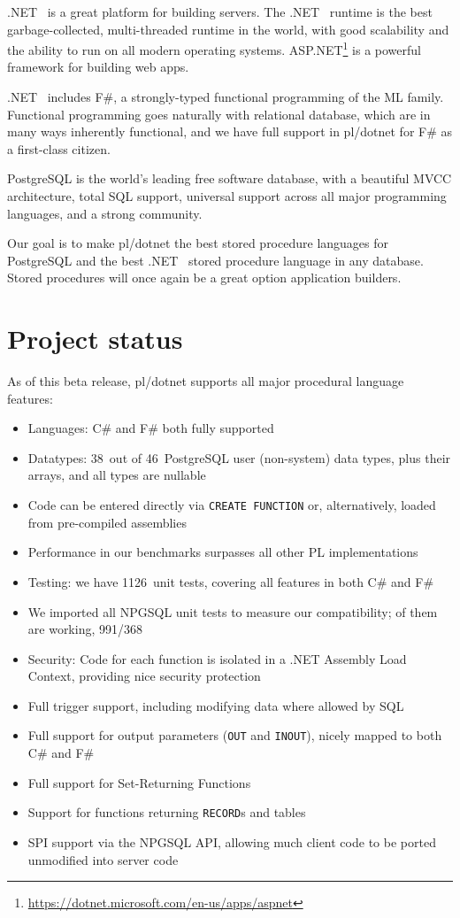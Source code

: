 \documentclass[sigconf,techreport,authorversion,nonacm]{acmart}
\newcommand{\dotnet}{.NET }
\newcommand{\psqltypecount}{46}
\newcommand{\pldotnettypecount}{38}
\newcommand{\unittestcount}{1126}
\newcommand{\npgsqlcount}{991}
\newcommand{\npgsqlpassing}{368}
\begin{document}
\dotnet\ is a great platform for building servers. The \dotnet\ runtime
is the best garbage-collected, multi-threaded runtime in the world, with
good scalability and the ability to run on all modern operating systems.
ASP.NET\footnote{\url{https://dotnet.microsoft.com/en-us/apps/aspnet}}
is a powerful framework for building web apps.

\dotnet\ includes F\#, a strongly-typed functional programming of the ML
family.  Functional programming goes naturally with relational database,
which are in many ways inherently functional, and we have full support
in pl/dotnet for F\# as a first-class citizen.

PostgreSQL is the world's leading free software database, with a
beautiful MVCC architecture, total SQL support, universal support
across all major programming languages, and a strong community.

Our goal is to make pl/dotnet the best stored procedure
languages for PostgreSQL and the best \dotnet\ stored procedure
language in any database.  Stored procedures will once again
be a great option application builders.

\section{Project status}

As of this beta release, pl/dotnet supports all major procedural language features:

\begin{itemize}[itemsep=0pt]
    \item Languages: C\# and F\# both fully supported
    \item Datatypes: \pldotnettypecount\ out of \psqltypecount\ PostgreSQL user (non-system) data types, plus their arrays, and all types are nullable
    \item Code can be entered directly via \texttt{CREATE FUNCTION} or, alternatively, loaded from pre-compiled assemblies
    \item Performance in our benchmarks surpasses all other PL implementations
    \item Testing: we have \unittestcount\, unit tests, covering all features in both C\# and F\#
    \item We imported all NPGSQL unit tests to measure our compatibility; \npgsqlpercentage of them are working, \npgsqlcount /\npgsqlpassing
    \item Security: Code for each function is isolated in a \dotnet Assembly Load Context, providing nice security protection
    \item Full trigger support, including modifying data where allowed by SQL
    \item Full support for output parameters (\texttt{OUT} and \texttt{INOUT}), nicely mapped to both C\# and F\#
    \item Full support for Set-Returning Functions
    \item Support for functions returning \texttt{RECORD}s and tables
    \item SPI support via the NPGSQL API, allowing much client code to be ported unmodified into server code
\end{itemize}
\end{document}
